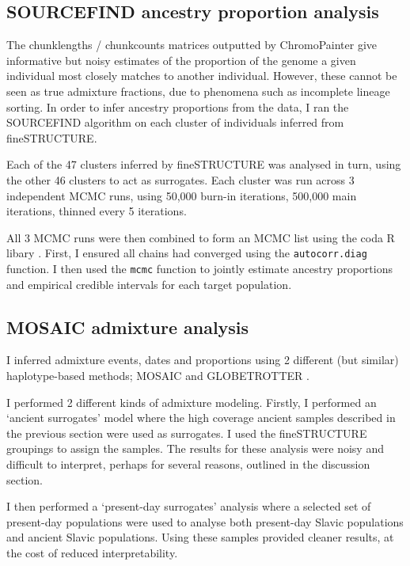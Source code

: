 \subsection{SOURCEFIND ancestry proportion analysis}

The chunklengths / chunkcounts matrices outputted by ChromoPainter give informative but noisy estimates of the proportion of the genome a given individual most closely matches to another individual. However, these cannot be seen as true admixture fractions, due to phenomena such as incomplete lineage sorting. In order to infer ancestry proportions from the data, I ran the SOURCEFIND algorithm \cite{Chacon-Duque2018} on each cluster of individuals inferred from fineSTRUCTURE.

Each of the 47 clusters inferred by fineSTRUCTURE was analysed in turn, using the other 46 clusters to act as surrogates. Each cluster was run across 3 independent MCMC runs, using 50,000 burn-in iterations, 500,000 main iterations, thinned every 5 iterations. 

All 3 MCMC runs were then combined to form an MCMC list using the coda R libary \cite{oro22547}. First, I ensured all chains had converged using the \texttt{autocorr.diag} function. I then used the \texttt{mcmc} function to jointly estimate ancestry proportions and empirical credible intervals for each target population. 

\subsection{MOSAIC admixture analysis}

I inferred admixture events, dates and proportions using 2 different (but similar) haplotype-based methods; MOSAIC \cite{MOSAIC_2019} and GLOBETROTTER \cite{Hellenthal2014}. 

I performed 2 different kinds of admixture modeling. Firstly, I performed an `ancient surrogates' model where the high coverage ancient samples described in the previous section were used as surrogates. I used the fineSTRUCTURE groupings to assign the samples. The results for these analysis were noisy and difficult to interpret,  perhaps for several reasons, outlined in the discussion section. 

I then performed a `present-day surrogates' analysis where a selected set of present-day populations were used to analyse both present-day Slavic populations and ancient Slavic populations. Using these samples provided cleaner results, at the cost of reduced interpretability. 

